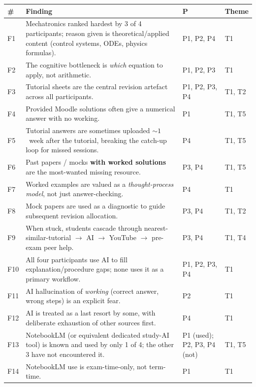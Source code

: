\documentclass[a4paper,11pt]{article}
\begin{document}
\setlength{\emergencystretch}{3em}
\begin{longtable}{@{}>{\raggedright\arraybackslash}p{0.8cm}>{\raggedright\arraybackslash}p{10.4cm}>{\raggedright\arraybackslash}p{2.6cm}>{\raggedright\arraybackslash}p{1.5cm}@{}}
\toprule
\textbf{\#} & \textbf{Finding} & \textbf{P} & \textbf{Theme} \\
\midrule
\endhead
F1  & Mechatronics ranked hardest by 3 of 4 participants; reason given is theoretical/applied content (control systems, ODEs, physics formulas). & P1, P2, P4 & T1 \\
F2  & The cognitive bottleneck is \emph{which} equation to apply, not arithmetic. & P1, P2, P3 & T1 \\
F3  & Tutorial sheets are the central revision artefact across all participants. & P1, P2, P3, P4 & T1, T2 \\
F4  & Provided Moodle solutions often give a numerical answer with no working. & P1 & T1, T5 \\
F5  & Tutorial answers are sometimes uploaded ${\sim}1$~week after the tutorial, breaking the catch-up loop for missed sessions. & P4 & T1, T5 \\
F6  & Past papers / mocks \textbf{with worked solutions} are the most-wanted missing resource. & P3, P4 & T1, T5 \\
F7  & Worked examples are valued as a \emph{thought-process model}, not just answer-checking. & P4 & T1 \\
F8  & Mock papers are used as a diagnostic to guide subsequent revision allocation. & P3, P4 & T1, T2 \\
F9  & When stuck, students cascade through nearest-similar-tutorial $\rightarrow$ AI $\rightarrow$ YouTube $\rightarrow$ pre-exam peer help. & P3, P4 & T1, T4 \\
F10 & All four participants use AI to fill explanation/procedure gaps; none uses it as a primary workflow. & P1, P2, P3, P4 & T1 \\
F11 & AI hallucination of \emph{working} (correct answer, wrong steps) is an explicit fear. & P2 & T1 \\
F12 & AI is treated as a last resort by some, with deliberate exhaustion of other sources first. & P4 & T1 \\
F13 & NotebookLM (or equivalent dedicated study-AI tool) is known and used by only 1 of 4; the other 3 have not encountered it. & P1 (used); P2, P3, P4 (not) & T1, T5 \\
F14 & NotebookLM use is exam-time-only, not term-time. & P1 & T1 \\

\end{longtable}
\end{document}
